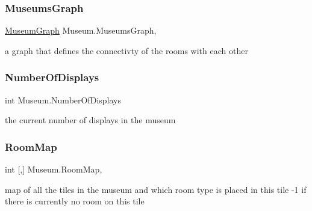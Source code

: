 \mbox{\label{class_museum_abdd7abe1cc5b4de86c868edb9f3ca177}} 
\subsubsection{\texorpdfstring{Museums\+Graph}{MuseumsGraph}}
{\footnotesize\ttfamily \mbox{\hyperlink{class_museum_graph}{Museum\+Graph}} Museum.\+Museums\+Graph\hspace{0.3cm}{\ttfamily [get]}, {}}



a graph that defines the connectivty of the rooms with each other 

\mbox{\label{class_museum_ac6942612f3be979812b450ee9140caf1}} 
\subsubsection{\texorpdfstring{Number\+Of\+Displays}{NumberOfDisplays}}
{\footnotesize\ttfamily int Museum.\+Number\+Of\+Displays\hspace{0.3cm}{\ttfamily [get]}}



the current number of displays in the museum 

\mbox{\label{class_museum_add7cf92391f0c501eaf2ebb76ddd54f6}} 
\subsubsection{\texorpdfstring{Room\+Map}{RoomMap}}
{\footnotesize\ttfamily int \mbox{[},\mbox{]} Museum.\+Room\+Map\hspace{0.3cm}{\ttfamily [get]}, {}}



map of all the tiles in the museum and which room type is placed in this tile -\/1 if there is currently no room on this tile 

\mbox{\label{class_museum_afbe49bbdcf1b263d32fd0ae323289e7d}} 

